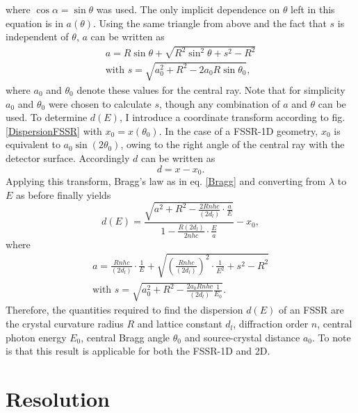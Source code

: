 where $\cos\alpha = \sin\theta$ was used. The only implicit dependence on 
$\theta$ left in this equation is in $a(\theta)$. Using the same triangle from 
above and the fact that $s$ is independent of $\theta$, $a$ can be written as
\begin{equation}
	\begin{gathered}
		a = R\sin\theta+\sqrt{R^2\sin^2\theta + s^2 - R^2} \\
		\text{with }s = \sqrt{a_0^2 + R^2 - 2a_0R\sin\theta_0},
	\end{gathered}
\end{equation}
where $a_0$ and $\theta_0$ denote these values for the central ray. Note that 
for simplicity $a_0$ and $\theta_0$ were chosen to calculate $s$, though any 
combination of $a$ and $\theta$ can be used. To determine $d(E)$, I introduce a 
coordinate transform according to fig. 
\ref{DispersionFSSR} with $x_0 = x(\theta_0)$. In the case of a FSSR-1D 
geometry, $x_0$ is equivalent to $a_0\sin(2\theta_0)$, owing to the right angle 
of the central ray with the detector surface. Accordingly $d$ can be written as
\begin{equation}
	d = x - x_0.
\end{equation}
Applying this transform, Bragg's law as in eq. \ref{Bragg} and converting from 
$\lambda$ to $E$ as 
before finally yields
\begin{equation}
	d(E) = \frac{\sqrt{a^2+R^2-\frac{2Rnhc}{(2d_l)} \cdot 
	\frac{a}{E}}}{1-\frac{R(2d_l)}{2nhc}\cdot\frac{E}{a}} - x_0,
	\label{DispersionCalcFSSR}
\end{equation}
where
\begin{equation}
	\begin{gathered}
	a = 
	\frac{Rnhc}{(2d_l)}\cdot\frac{1}{E}+\sqrt{\left( 
	\frac{Rnhc}{(2d_l)}\right)^2\cdot\frac{1}{E^2}
	 + s^2 - R^2} \\
	\text{with } s = \sqrt{a_0^2 + R^2 - \frac{2a_0Rnhc}{(2d_l)}\frac{1}{E_0}}.
	\end{gathered}
\end{equation}
Therefore, the quantities required to find the dispersion $d(E)$ of an FSSR are 
the 
crystal curvature radius $R$ and lattice constant $d_l$, diffraction order $n$, 
central photon energy $E_0$, central Bragg angle $\theta_0$ and source-crystal 
distance $a_0$. To note is that this result is applicable for both the FSSR-1D 
and 2D.



\section{Resolution}
\label{section: resolution theory}

